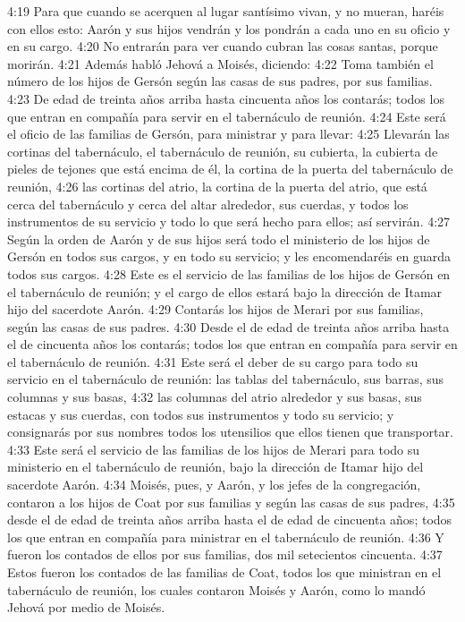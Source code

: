 4:19 Para que cuando se acerquen al lugar santísimo vivan, y no mueran, haréis con ellos esto: Aarón y sus hijos vendrán y los pondrán a cada uno en su oficio y en su cargo.  
4:20 No entrarán para ver cuando cubran las cosas santas, porque morirán.  
4:21 Además habló Jehová a Moisés, diciendo:  
4:22 Toma también el número de los hijos de Gersón según las casas de sus padres, por sus familias.  
4:23 De edad de treinta años arriba hasta cincuenta años los contarás; todos los que entran en compañía para servir en el tabernáculo de reunión.  
4:24 Este será el oficio de las familias de Gersón, para ministrar y para llevar:  
4:25 Llevarán las cortinas del tabernáculo, el tabernáculo de reunión, su cubierta, la cubierta de pieles de tejones que está encima de él, la cortina de la puerta del tabernáculo de reunión, 
4:26 las cortinas del atrio, la cortina de la puerta del atrio, que está cerca del tabernáculo y cerca del altar alrededor, sus cuerdas, y todos los instrumentos de su servicio y todo lo que será hecho para ellos; así servirán.  
4:27 Según la orden de Aarón y de sus hijos será todo el ministerio de los hijos de Gersón en todos sus cargos, y en todo su servicio; y les encomendaréis en guarda todos sus cargos.  
4:28 Este es el servicio de las familias de los hijos de Gersón en el tabernáculo de reunión; y el cargo de ellos estará bajo la dirección de Itamar hijo del sacerdote Aarón.  
4:29 Contarás los hijos de Merari por sus familias, según las casas de sus padres.  
4:30 Desde el de edad de treinta años arriba hasta el de cincuenta años los contarás; todos los que entran en compañía para servir en el tabernáculo de reunión.  
4:31 Este será el deber de su cargo para todo su servicio en el tabernáculo de reunión: las tablas del tabernáculo, sus barras, sus columnas y sus basas,  
4:32 las columnas del atrio alrededor y sus basas, sus estacas y sus cuerdas, con todos sus instrumentos y todo su servicio; y consignarás por sus nombres todos los utensilios que ellos tienen que transportar.  
4:33 Este será el servicio de las familias de los hijos de Merari para todo su ministerio en el tabernáculo de reunión, bajo la dirección de Itamar hijo del sacerdote Aarón.  
4:34 Moisés, pues, y Aarón, y los jefes de la congregación, contaron a los hijos de Coat por sus familias y según las casas de sus padres,  
4:35 desde el de edad de treinta años arriba hasta el de edad de cincuenta años; todos los que entran en compañía para ministrar en el tabernáculo de reunión.  
4:36 Y fueron los contados de ellos por sus familias, dos mil setecientos cincuenta.  
4:37 Estos fueron los contados de las familias de Coat, todos los que ministran en el tabernáculo de reunión, los cuales contaron Moisés y Aarón, como lo mandó Jehová por medio de Moisés.  
